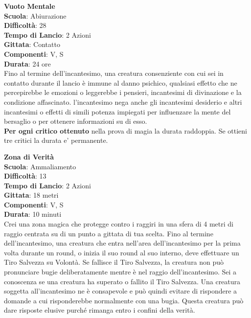 \begin{multicols}{2}
\medskip\textbf{Vuoto Mentale}\\
\textbf{Scuola}: Abiurazione\\
\textbf{Difficoltà}: 28\\
\textbf{Tempo di Lancio}: 2 Azioni\\
\textbf{Gittata}: Contatto\\
\textbf{Componenti}: V, S\\
\textbf{Durata}: 24 ore\\
Fino al termine dell'incantesimo, una creatura consenziente con cui sei in contatto durante il lancio è immune al danno psichico, qualsiasi effetto che ne percepirebbe le emozioni o leggerebbe i pensieri, incantesimi di divinazione e la condizione affascinato. l'incantesimo nega anche gli incantesimi desiderio e altri incantesimi o effetti di simili potenza impiegati per
influenzare la mente del bersaglio o per ottenere informazioni su di esso.\\
\textbf{Per ogni critico ottenuto} nella prova di magia la durata raddoppia. Se ottieni tre critici la durata e' permanente.

\medskip\textbf{Zona di Verità}\\
\textbf{Scuola}: Ammaliamento\\
\textbf{Difficoltà}: 13\\
\textbf{Tempo di Lancio}: 2 Azioni\\
\textbf{Gittata}: 18 metri\\
\textbf{Componenti}: V, S\\
\textbf{Durata}: 10 minuti\\
Crei una zona magica che protegge contro i raggiri in una sfera di 4 metri di raggio centrata su di un punto a gittata di tua scelta. Fino al termine dell'incantesimo, una creatura che entra nell'area dell'incantesimo per la prima volta durante un round, o inizia il suo round al suo interno, deve effettuare un Tiro Salvezza su Volontà. Se fallisce il Tiro Salvezza, la creatura non può pronunciare bugie deliberatamente mentre è nel raggio dell'incantesimo. Sei a conoscenza se una creatura ha superato o fallito il Tiro Salvezza. Una creatura soggetta all'incantesimo ne è consapevole e può quindi evitare di rispondere a domande a cui risponderebbe normalmente con una bugia. Questa creatura può dare risposte elusive purché rimanga entro i confini della verità.

\end{multicols}

